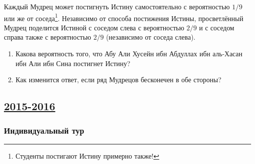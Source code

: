 \begin{enumerate}
Каждый Мудрец может постигнуть Истину самостоятельно с вероятностью $1/9$
или же от соседа\footnote{Студенты постигают Истину примерно также!}. Независимо
от способа постижения Истины, просветлённый Мудрец поделится Истиной с соседом
слева с вероятностью $2/9$ и с соседом справа также с вероятностью $2/9$ (независимо
от соседа слева).
\begin{enumerate}
\item Какова вероятность того, что Абу Али Хусейн ибн Абдуллах ибн аль-Хасан ибн
Али ибн Сина постигнет Истину?
\item Как изменится ответ, если ряд Мудрецов бесконечен в обе стороны?
\end{enumerate}
\end{enumerate}



\newpage
\subsection[2015-2016]{\hyperref[sec:sol_kr_01_ip_2015_2016]{2015-2016}}
\label{sec:kr_01_ip_2015_2016}

\subsubsection*{Индивидуальный тур}

